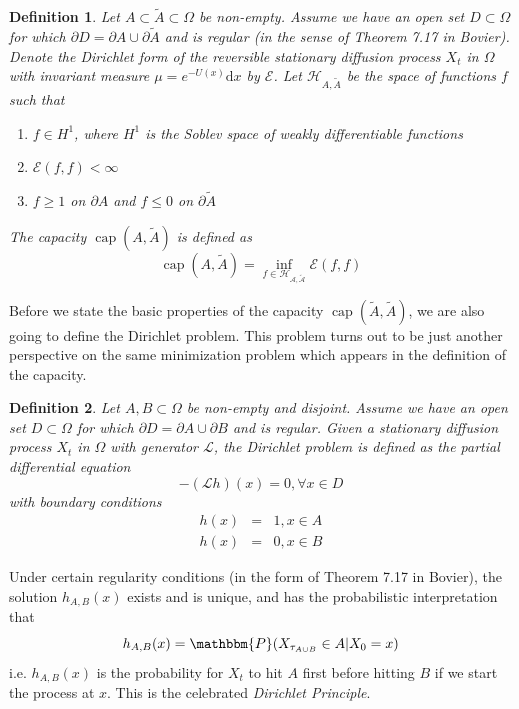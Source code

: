 \documentclass[english, aip, jcp, priprint, graphicx,floatfix]{revtex4-1}
\newtheorem{definition}{Definition}
\theoremstyle{plain}
\theoremstyle{definition}
\theoremstyle{plain}
\begin{document}
\begin{definition}
Let $A \subset \tilde{A} \subset \Omega$ be non-empty. Assume we have an
open set $D \subset \Omega$ for which $\partial D = \partial A \cup \partial
\tilde{A}$ and is regular (in the sense of Theorem 7.17 in
Bovier\cite{Bovier2016-ez}). Denote the Dirichlet form of the reversible
stationary diffusion process $X_t$ in $\Omega$ with invariant measure
${\mu}= e^{- U (x)} \mathrm{d} x$ by $\mathcal{E}$. Let $\mathcal{H}_{A,
\tilde{A}}$ be the space of functions $f$ such that
\begin{enumerate}
\item $f \in H^1$, where $H^1$ is the Soblev space of weakly
differentiable functions

\item $\mathcal{E} (f, f) < \infty$

\item $f \geqslant 1$ on $\partial A$ and $f \leqslant 0$ on $\partial
\tilde{A}$
\end{enumerate}
The capacity $\ensuremath{\operatorname{cap}} (A, \tilde{A})$ is defined as
\[ \ensuremath{\operatorname{cap}} (A, \tilde{A}) = \inf_{f \in
\mathcal{H_{A, \tilde{A}}}} \mathcal{E} (f, f) \]
\end{definition}

Before we state the basic properties of the capacity
$\ensuremath{\operatorname{cap}} (\tilde{A}, \tilde{A})$, we are also going to
define the Dirichlet problem. This problem turns out to be just another
perspective on the same minimization problem which appears in the definition
of the capacity.

\begin{definition}
Let $A, B \subset \Omega$ be non-empty and disjoint. Assume we have an open
set $D \subset \Omega$ for which $\partial D = \partial A \cup \partial B$
and is regular. Given a stationary diffusion process $X_t$ in $\Omega$ with
generator $\mathcal{L}$, the Dirichlet problem is defined as the partial
differential equation
\[ - (\mathcal{L} h) (x) = 0, \forall x \in D \]
with boundary conditions
\begin{eqnarray*}
h (x) & = & 1, x \in A\\
h (x) & = & 0, x \in B
\end{eqnarray*}
\end{definition}

Under certain regularity conditions (in the form of Theorem 7.17 in
Bovier\cite{Bovier2016-ez}), the solution $h_{A, B} (x)$ exists and is
unique, and has the probabilistic interpretation that
\[ h_{A, B} (x) =\mathbbm{P} (X_{\tau_{A \cup B}} \in A|X_0 = x) \]
i.e. $h_{A, B} (x)$ is the probability for $X_t$ to hit $A$ first before
hitting $B$ if we start the process at $x$. This is the celebrated
{\itshape{Dirichlet Principle}}.
\end{document}
